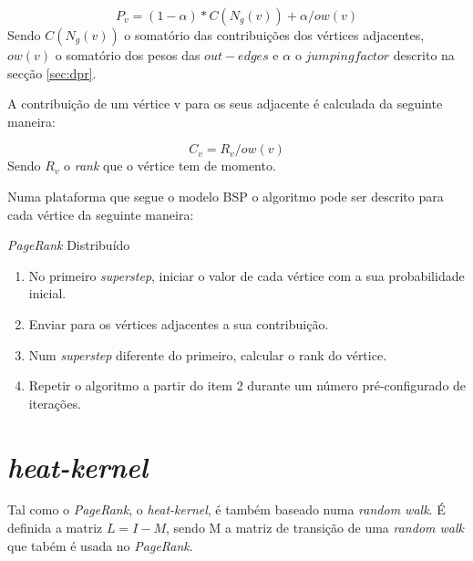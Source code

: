   \begin{center}
    \begin{equation}
      \label{eq:prrankdistributed}
       P_v = (1-\alpha) * C(N_g(v)) + \alpha/ow(v)
    \end{equation}
    Sendo $C(N_g(v))$ o somatório das contribuições dos vértices adjacentes, $ow(v)$ o somatório dos pesos das $out-edges$ e $\alpha$ o $jumping factor$ descrito na secção \ref{sec:dpr}.
  \end{center}    
  
  A contribuição de um vértice v para os seus adjacente é calculada da seguinte maneira:
 
  \begin{center}
    \begin{equation}
      \label{eq:prcontributiondistributed}
       C_v=R_v/ow(v)
    \end{equation}
    Sendo $R_v$ o \textit{rank} que o vértice tem de momento.
  \end{center}    
  
  Numa plataforma que segue o modelo BSP o algoritmo pode ser descrito para cada vértice da seguinte maneira:
  \begin{algorithm}
    \caption{\textit{PageRank} Distribuído}\label{alg:prdistributed}
    \begin{enumerate}
      \item No primeiro \textit{superstep}, iniciar o valor de cada vértice com a sua probabilidade inicial.
      \item Enviar para os vértices adjacentes a sua contribuição.
      \item Num \textit{superstep} diferente do primeiro, calcular o rank do vértice.
      \item Repetir o algoritmo a partir do item 2 durante um número pré-configurado de iterações.
    \end{enumerate}
  \end{algorithm}
  
\section{\textit{heat-kernel}}

  \label{sec:heatkerneldefinition}
  
    Tal como o \textit{PageRank}, o \textit{heat-kernel}, é também baseado numa \textit{random walk}. 
    É  definida a matriz $L=I-M$, sendo M a matriz de transição de uma \textit{random walk} que tabém é usada no \textit{PageRank}.
    
